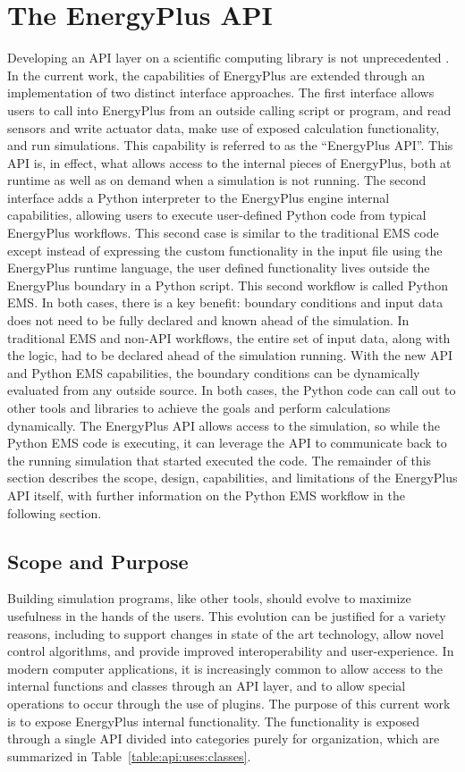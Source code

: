 \documentclass[5p, authoryear]{elsarticle}
\begin{document}
\section{The EnergyPlus API} 
Developing an API layer on a scientific computing library is not unprecedented \citep{Mohanan2018, Gratiy2018, Lotz2020}.
In the current work, the capabilities of EnergyPlus are extended through an implementation of two distinct interface approaches.
The first interface allows users to call into EnergyPlus from an outside calling script or program, and read sensors and write actuator data, make use of exposed calculation functionality, and run simulations.
This capability is referred to as the ``EnergyPlus API''.
This API is, in effect, what allows access to the internal pieces of EnergyPlus, both at runtime as well as on demand when a simulation is not running.
The second interface adds a Python interpreter to the EnergyPlus engine internal capabilities, allowing users to execute user-defined Python code from typical EnergyPlus workflows.  
This second case is similar to the traditional EMS code except instead of expressing the custom functionality in the input file using the EnergyPlus runtime language, the user defined functionality lives outside the EnergyPlus boundary in a Python script.
This second workflow is called Python EMS.
In both cases, there is a key benefit: boundary conditions and input data does not need to be fully declared and known ahead of the simulation.
In traditional EMS and non-API workflows, the entire set of input data, along with the logic, had to be declared ahead of the simulation running.
With the new API and Python EMS capabilities, the boundary conditions can be dynamically evaluated from any outside source.
In both cases, the Python code can call out to other tools and libraries to achieve the goals and perform calculations dynamically.
The EnergyPlus API allows access to the simulation, so while the Python EMS code is executing, it can leverage the API to communicate back to the running simulation that started executed the code.
The remainder of this section describes the scope, design, capabilities, and limitations of the EnergyPlus API itself, with further information on the Python EMS workflow in the following section.
 
  \subsection{Scope and Purpose}
Building simulation programs, like other tools, should evolve to maximize usefulness in the hands of the users.
This evolution can be justified for a variety reasons, including to support changes in state of the art technology, allow novel control algorithms, and provide improved interoperability and user-experience.
In modern computer applications, it is increasingly common to allow access to the internal functions and classes through an API layer, and to allow special operations to occur through the use of plugins.
The purpose of this current work is to expose EnergyPlus internal functionality.
The functionality is exposed through a single API divided into categories purely for organization, which are summarized in Table~\ref{table:api:uses:classes}.
\end{document}
